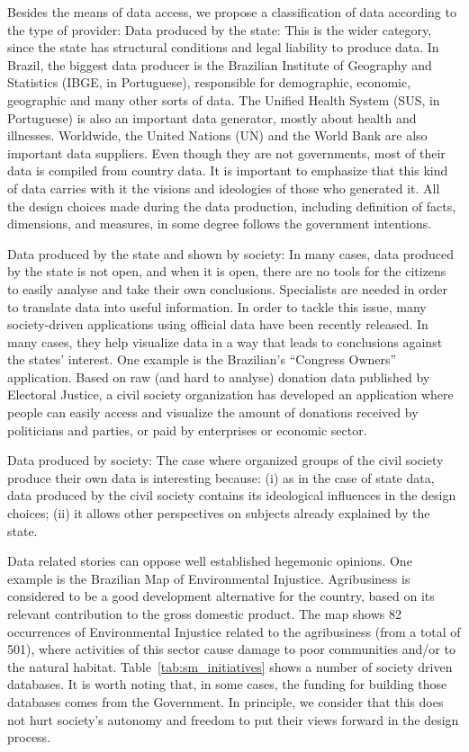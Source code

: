 Besides the means of data access, we propose a classification of data according to the type of provider:
Data produced by the state: This is the wider category, since the state has structural conditions and legal liability to produce data. In Brazil, the biggest data producer is the Brazilian Institute of Geography and Statistics (IBGE, in Portuguese), responsible for demographic, economic, geographic and many other sorts of data. The Unified Health System (SUS, in Portuguese) is also an important data generator, mostly about health and illnesses. Worldwide, the United Nations (UN) and the World Bank are also important data suppliers. Even though they are not governments, most of their data is compiled from country data. It is important to emphasize that this kind of data carries with it the visions and ideologies of those who generated it. All the design choices made during the data production, including definition of facts, dimensions, and measures, in some degree follows the government intentions.

Data produced by the state and shown by society: In many cases, data produced by the state is not open, and when it is open, there are no tools for the citizens to easily analyse and take their own conclusions. Specialists are needed in order to translate data into useful information. In order to tackle this issue, many society-driven applications using official data have been recently released. In many cases, they help visualize data in a way that leads to conclusions against the states' interest. One example is the Brazilian's “Congress Owners” application. Based on raw (and hard to analyse) donation data published by Electoral Justice, a civil society organization has developed an application where people can easily access and visualize the amount of donations received by politicians and parties, or paid by enterprises or economic sector. 

Data produced by society: The case where organized groups of the civil society produce their own data is interesting because: (i) as in the case of state data, data produced by the civil society contains its ideological influences in the design choices; (ii) it allows other perspectives on subjects already explained by the state. 

Data related stories can oppose well established hegemonic opinions. One example is the Brazilian Map of Environmental Injustice. Agribusiness is considered to be a good development alternative for the country, based on its relevant contribution to the gross domestic product. The map shows 82 occurrences of Environmental Injustice related to the agribusiness (from a total of 501), where activities of this sector cause damage to poor communities and/or to the natural habitat. Table~\ref{tab:sm_initiatives} shows a number of society driven databases. It is worth noting that, in some cases, the funding for building those databases comes from the Government. In principle, we consider that this does not hurt society’s autonomy and freedom to put their views forward in the design process.


